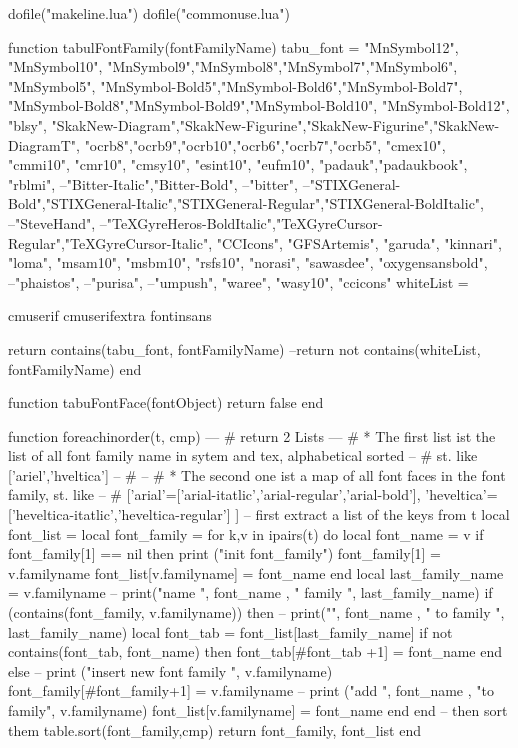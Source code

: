 ﻿\documentclass[12pt,a4paper]{article}
\begin{document}
\begin{luacode*}


dofile("makeline.lua")
dofile("commonuse.lua")

function tabulFontFamily(fontFamilyName)
	tabu_font = {
	"MnSymbol12", "MnSymbol10", "MnSymbol9","MnSymbol8","MnSymbol7","MnSymbol6", "MnSymbol5",
	"MnSymbol-Bold5","MnSymbol-Bold6","MnSymbol-Bold7", "MnSymbol-Bold8","MnSymbol-Bold9","MnSymbol-Bold10", "MnSymbol-Bold12",
	"blsy",
	"SkakNew-Diagram","SkakNew-Figurine","SkakNew-Figurine","SkakNew-DiagramT",
	"ocrb8","ocrb9","ocrb10","ocrb6","ocrb7","ocrb5",
	"cmex10",
	"cmmi10",
	"cmr10",
	"cmsy10",
	"esint10",
	"eufm10",
	"padauk","padaukbook",
	"rblmi",
	--"Bitter-Italic","Bitter-Bold",
	--"bitter",
	--"STIXGeneral-Bold","STIXGeneral-Italic","STIXGeneral-Regular","STIXGeneral-BoldItalic",
	--"SteveHand",
	--"TeXGyreHeros-BoldItalic","TeXGyreCursor-Regular","TeXGyreCursor-Italic",
	"CCIcons",
	"GFSArtemis",
	"garuda",
	"kinnari",
	"loma",
	"msam10",
	"msbm10",
	"rsfs10",
	"norasi",
	"sawasdee",
	"oxygensansbold",
	--"phaistos",
	--"purisa",
	--"umpush",
	"waree",
	"wasy10",
	"ccicons"
	}
	whiteList ={
		cmuserif
		cmuserifextra 
		fontinsans
		
	}
	return contains(tabu_font, fontFamilyName)
	--return not contains(whiteList, fontFamilyName)
end
	
function tabuFontFace(fontObject)
	return false
end


function foreachinorder(t, cmp)
	--- # return 2 Lists
	--- # * The first list ist the list of all font family name in sytem and tex, alphabetical sorted
	--  # st. like ['ariel','hveltica']
	--  # 
	--  # * The second one ist a map of all font faces in the font family, st. like
	--  # ['arial'=['arial-itatlic','arial-regular','arial-bold'], 'heveltica'=['heveltica-itatlic','heveltica-regular'] ]
    -- first extract a list of the keys from t
    local font_list = {}
    local font_family = {}
    for k,v in ipairs(t) do
		local font_name = v
		if font_family[1] == nil then
			print ("init font_family")
			font_family[1] = v.familyname
			font_list[v.familyname] = {font_name}
		end
		local last_family_name = v.familyname
		-- print("name ", font_name , " family ", last_family_name)
		if (contains(font_family, v.familyname)) then
			-- print("", font_name , " to family ", last_family_name)
			local font_tab = font_list[last_family_name]
			if not contains(font_tab, font_name) then
				font_tab[#font_tab +1] = font_name
			end
		else
			-- print ("insert new font family ", v.familyname)
			font_family[#font_family+1] = v.familyname
			-- print ("add ", font_name , "to family", v.familyname)
			font_list[v.familyname] = {font_name}
		end
    end
 	-- then sort them   
    table.sort(font_family,cmp)
    return font_family, font_list
end



\end{luacode*}
\end{document}
